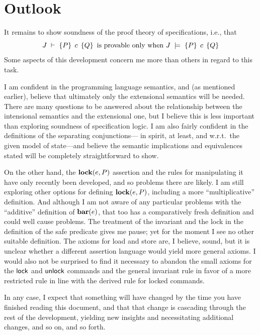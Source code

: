 \documentclass[11pt]{article}
\begin{document}
\section{Outlook}

It remains to show soundness of the proof theory of specifications, i.e., that \[ J\;\vdash\;\left\lbrace P \right\rbrace\;c\;\left\lbrace Q \right\rbrace \text{ is provable only when } J\;\models\;\left\lbrace P \right\rbrace\;c\;\left\lbrace Q \right\rbrace\] Some aspects of this development concern me more than others in regard to this task. 

I am confident in the programming language semantics, and (as mentioned earlier), believe that ultimately only the extensional semantics will be needed. There are many questions to be answered about the relationship between the intensional semantics and the extensional one, but I believe this is less important than exploring soundness of specification logic. I am also fairly confident in the definitions of the separating conjunctions--- in spirit, at least, and w.r.t.~the given model of state---and believe the semantic implications and equivalences stated will be completely straightforward to show. 

On the other hand, the $\mathbf{lock}(e,P)$ assertion and the rules for manipulating it have only recently been developed, and so problems there are likely. I am still exploring other options for defining $\mathbf{lock}(e,P)$, including a more ``multiplicative'' definition. And although I am not aware of any particular problems with the ``additive'' definition of $\mathbf{bar}(e)$, that too has a comparatively fresh definition and could well cause problems. The treatment of the invariant and the lock in the definition of the \textsf{safe} predicate gives me pause; yet for the moment I see no other suitable definition. The axioms for load and store are, I believe, sound, but it is unclear whether a different assertion language would yield more general axioms. I would also not be surprised to find it necessary to abandon the small axioms for the $\operatorname{\mathsf{lock}}$ and $\operatorname{\mathsf{unlock}}$ commands and the general invariant rule in favor of a more restricted rule in line with the derived rule for locked commands. 

In any case, I expect that something will have changed by the time you have finished reading this document, and that that change is cascading through the rest of the development, yielding new insights and necessitating additional changes, and so on, and so forth.  


 
\end{document}
